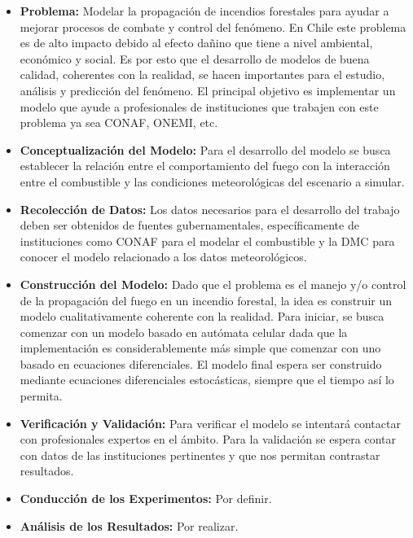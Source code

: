 \documentclass[12pt]{article}
\begin{document}
\begin{enumerate}
        \begin{itemize}
          \item \textbf{Problema:} Modelar la propagación de incendios forestales para ayudar a mejorar 
            procesos de combate y control del fenómeno. En Chile este problema es de alto impacto debido al 
            efecto dañino que tiene a nivel ambiental, económico y social. Es por esto que el desarrollo de 
            modelos de buena calidad, coherentes con la realidad, se hacen importantes para el estudio, análisis 
            y predicción del fenómeno. El principal objetivo es implementar un modelo que ayude a profesionales 
            de instituciones que trabajen con este problema ya sea CONAF, ONEMI, etc.
          \item \textbf{Conceptualización del Modelo:} Para el desarrollo del modelo se busca establecer la 
            relación entre el comportamiento del fuego con la interacción entre el combustible y las condiciones
            meteorológicas del escenario a simular.
          \item \textbf{Recolección de Datos:} Los datos necesarios para el desarrollo del trabajo deben ser 
            obtenidos de fuentes gubernamentales, específicamente de instituciones como CONAF para el modelar
            el combustible y la DMC para conocer el modelo relacionado a los datos meteorológicos.
          \item \textbf{Construcción del Modelo:} Dado que el problema es el manejo y/o control de la 
            propagación del fuego en un incendio forestal, la idea es construir un modelo cualitativamente 
            coherente con la realidad. Para iniciar, se busca comenzar con un modelo basado en autómata 
            celular dada que la implementación es considerablemente más simple que comenzar con uno basado
            en ecuaciones diferenciales. El modelo final espera ser construido mediante ecuaciones diferenciales
            estocásticas, siempre que el tiempo así lo permita.
          \item \textbf{Verificación y Validación:} Para verificar el modelo se intentará contactar con profesionales
            expertos en el ámbito. Para la validación se espera contar con datos de las instituciones pertinentes
            y que nos permitan contrastar resultados.
          \item \textbf{Conducción de los Experimentos:} Por definir.
          \item \textbf{Análisis de los Resultados:} Por realizar.
        \end{itemize}

    \end{enumerate}
        
\end{document}
